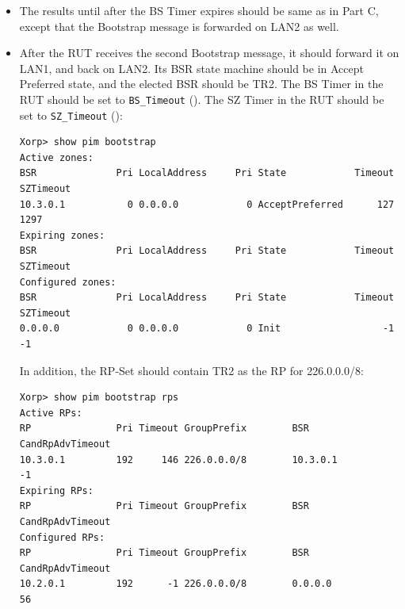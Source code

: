 \documentclass[11pt]{report}
\begin{document}
\begin{itemize}

  \item The results until after the BS Timer expires should be same as in Part
  C, except that the Bootstrap message is forwarded on LAN2 as well.

  \item After the RUT receives the second Bootstrap message, it should forward
        it on LAN1, and back on LAN2. Its BSR state machine
        should be in Accept Preferred state, and the elected BSR should be TR2.
        The BS Timer in the RUT should be set to \verb=BS_Timeout=
        ({\PimsmBSTimeout}).
        The SZ Timer in the RUT should be set to \verb=SZ_Timeout=
        ({\PimsmSZTimeout}):

\begin{verbatim}
Xorp> show pim bootstrap 
Active zones:
BSR              Pri LocalAddress     Pri State            Timeout SZTimeout
10.3.0.1           0 0.0.0.0            0 AcceptPreferred      127      1297
Expiring zones:
BSR              Pri LocalAddress     Pri State            Timeout SZTimeout
Configured zones:
BSR              Pri LocalAddress     Pri State            Timeout SZTimeout
0.0.0.0            0 0.0.0.0            0 Init                  -1        -1
\end{verbatim}

  In addition, the RP-Set should contain TR2 as the RP for 226.0.0.0/8:

\begin{verbatim}
Xorp> show pim bootstrap rps 
Active RPs:
RP               Pri Timeout GroupPrefix        BSR         CandRpAdvTimeout
10.3.0.1         192     146 226.0.0.0/8        10.3.0.1                  -1
Expiring RPs:
RP               Pri Timeout GroupPrefix        BSR         CandRpAdvTimeout
Configured RPs:
RP               Pri Timeout GroupPrefix        BSR         CandRpAdvTimeout
10.2.0.1         192      -1 226.0.0.0/8        0.0.0.0                   56
\end{verbatim}

\end{itemize}

\end{document}
